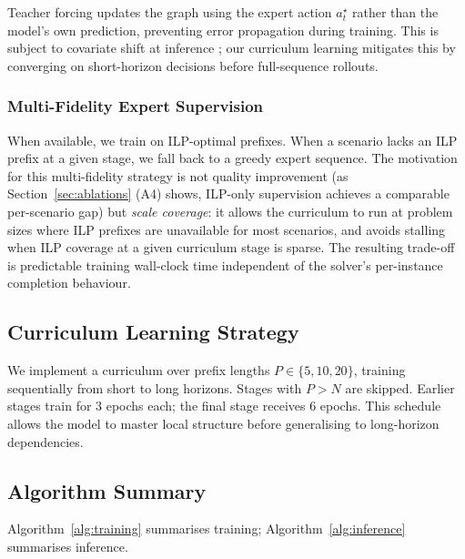 \documentclass[conference]{IEEEtran}
\begin{document}
Teacher forcing updates the graph using the expert action $a_t^\star$ rather than the model's own prediction, preventing error propagation during training. This is subject to covariate shift at inference \cite{ross2011dagger}; our curriculum learning mitigates this by converging on short-horizon decisions before full-sequence rollouts.

\subsubsection{Multi-Fidelity Expert Supervision}
When available, we train on ILP-optimal prefixes. When a scenario lacks an ILP prefix at a given stage, we fall back to a greedy expert sequence. The motivation for this multi-fidelity strategy is not quality improvement (as Section~\ref{sec:ablations} (A4) shows, ILP-only supervision achieves a comparable per-scenario gap) but \emph{scale coverage}: it allows the curriculum to run at problem sizes where ILP prefixes are unavailable for most scenarios, and avoids stalling when ILP coverage at a given curriculum stage is sparse. The resulting trade-off is predictable training wall-clock time independent of the solver's per-instance completion behaviour.

\subsection{Curriculum Learning Strategy}

We implement a curriculum over prefix lengths $P \in \{5, 10, 20\}$, training sequentially from short to long horizons. Stages with $P > N$ are skipped. Earlier stages train for 3 epochs each; the final stage receives 6 epochs. This schedule allows the model to master local structure before generalising to long-horizon dependencies.

\subsection{Algorithm Summary}

Algorithm~\ref{alg:training} summarises training; Algorithm~\ref{alg:inference} summarises inference.
\end{document}

